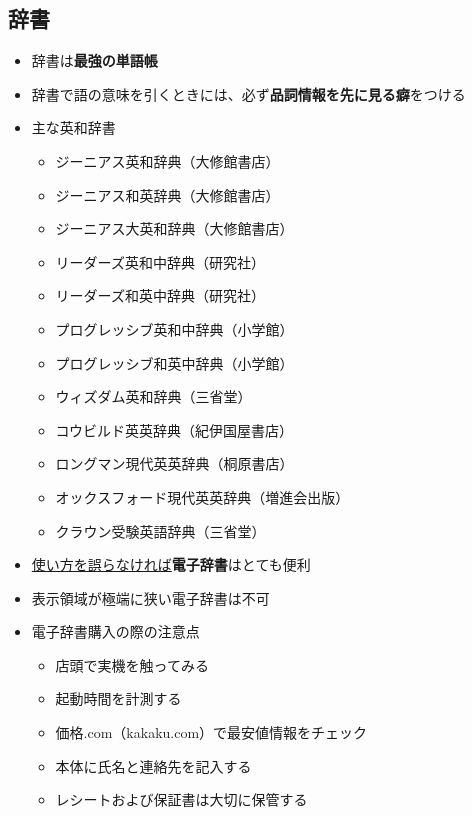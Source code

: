 \documentclass[titlepage]{jsarticle}
\begin{document}
 \subsection*{辞書}
  \begin{itemize}
   \item 辞書は{\bf 最強の単語帳}
   \item 辞書で語の意味を引くときには、必ず{\bf 品詞情報を先に見る癖}をつける
   \item 主な英和辞書
         \begin{itemize}
          \item ジーニアス英和辞典（大修館書店）
          \item ジーニアス和英辞典（大修館書店）
          \item ジーニアス大英和辞典（大修館書店）
          \item リーダーズ英和中辞典（研究社）
          \item リーダーズ和英中辞典（研究社）
          \item プログレッシブ英和中辞典（小学館）
          \item プログレッシブ和英中辞典（小学館）
          \item ウィズダム英和辞典（三省堂）
          \item コウビルド英英辞典（紀伊国屋書店）
          \item ロングマン現代英英辞典（桐原書店）
          \item オックスフォード現代英英辞典（増進会出版）
          \item クラウン受験英語辞典（三省堂）
         \end{itemize}
   \item \underline{使い方を誤らなければ}{\bf 電子辞書}はとても便利
   \item 表示領域が極端に狭い電子辞書は不可
   \item 電子辞書購入の際の注意点
         \begin{itemize}
          \item 店頭で実機を触ってみる
          \item 起動時間を計測する
          \item 価格.com（kakaku.com）で最安値情報をチェック
          \item 本体に氏名と連絡先を記入する
          \item レシートおよび保証書は大切に保管する
         \end{itemize}
  \end{itemize}
\end{document}
